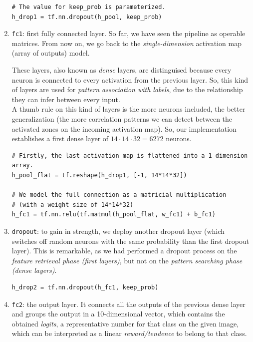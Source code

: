 \begin{enumerate}
			\begin{lstlisting}
# The value for keep_prob is parameterized.
h_drop1 = tf.nn.dropout(h_pool, keep_prob)
			\end{lstlisting}
			
			
			\item \texttt{fc1}: first fully connected layer. So far, we have seen the pipeline as operable matrices. From now on, we go back to the \emph{single-dimension} activation map (array of outputs) model.
			
			These layers, also known as \emph{dense} layers, are distinguised because every neuron is connected to every activation from the previous layer. So, this kind of layers are used for \textit{pattern association with labels}, due to the relationship they can infer between every input.\\
			
			A thumb rule on this kind of layers is the more neurons included, the better generalization (the more correlation patterns we can detect between the activated zones on the incoming activation map). So, our implementation establishes a first dense layer of $14 \cdot 14 \cdot 32 = 6272$ neurons.\\
			
			\begin{lstlisting}
# Firstly, the last activation map is flattened into a 1 dimension array.
h_pool_flat = tf.reshape(h_drop1, [-1, 14*14*32])

# We model the full connection as a matricial multiplication
# (with a weight size of 14*14*32)
h_fc1 = tf.nn.relu(tf.matmul(h_pool_flat, w_fc1) + b_fc1)
			\end{lstlisting}
			
			\item \texttt{dropout}: to gain in strength, we deploy another dropout layer (which switches off random neurons with the same probability than the first dropout layer). This is remarkable, as we had performed a dropout process on the \textit{feature retrieval phase (first layers)}, but not on the \textit{pattern searching phase (dense layers)}.
			
			\begin{lstlisting}
h_drop2 = tf.nn.dropout(h_fc1, keep_prob)
			\end{lstlisting}		

			\item \texttt{fc2}: the output layer. It connects all the outputs of the previous dense layer and groups the output in a 10-dimensional vector, which contains the obtained \emph{logits}, a representative number for that class on the given image, which can be interpreted as a linear \emph{reward/tendence} \cite{sutton-barto} to belong to that class.
			

\end{enumerate}
